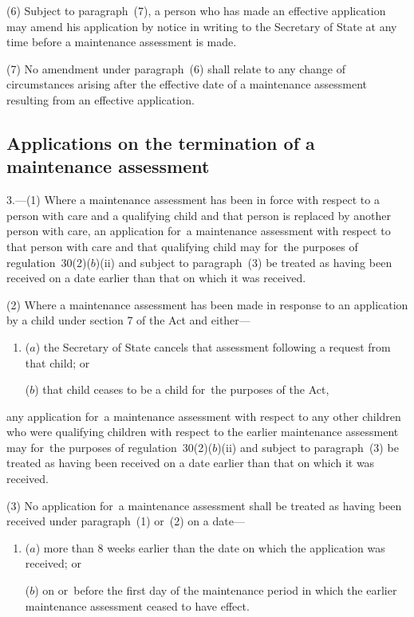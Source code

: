 \documentclass[a4paper,12pt]{article}
\begin{document}
(6) Subject to paragraph~(7), a person who has made an effective application may amend his application by notice in writing to the Secretary of State at any time before a maintenance assessment is made.

(7) No amendment under paragraph~(6) shall relate to any change of circumstances arising after the effective date of a maintenance assessment resulting from an effective application.


\subsection[3. Applications on the termination of a maintenance assessment]{Applications on the termination of a maintenance assessment}

3.—(1) Where a maintenance assessment has been in force with respect to a person with care and a qualifying child and that person is replaced by another person with care, an application for~a maintenance assessment with respect to that person with care and that qualifying child may for~the purposes of regulation~30(2)($b$)(ii) and subject to paragraph~(3) be treated as having been received on a date earlier than that on which it was received.

(2) Where a maintenance assessment has been made in response to an application by a child under section 7 of the Act and either—
\begin{enumerate}\item[]
($a$) 
the Secretary of State  %
cancels that assessment following a request from that child; or

($b$) that child ceases to be a child for~the purposes of the Act,
\end{enumerate}
any application for~a maintenance assessment with respect to any other children who were qualifying children with respect to the earlier maintenance assessment may for~the purposes of regulation~30(2)($b$)(ii) and subject to paragraph~(3) be treated as having been received on a date earlier than that on which it was received.

(3) No application for~a maintenance assessment shall be treated as having been received under paragraph~(1) or~(2) on a date—
\begin{enumerate}\item[]
($a$) more than 8 weeks earlier than the date on which the application was received; or

($b$) on or~before the first day of the maintenance period in which the earlier maintenance assessment ceased to have effect.
\end{enumerate}
\end{document}
